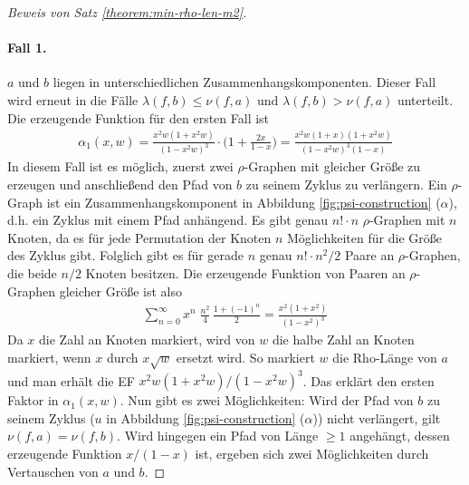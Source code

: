 \documentclass[a4paper, 10pt, ngerman]{article}
\begin{document}
\begin{proof}[Beweis von Satz \ref{theorem:min-rho-len-m2}]
        \paragraph{Fall 1.} $a$ und $b$ liegen in unterschiedlichen Zusammenhangskomponenten. Dieser Fall wird erneut in die Fälle $\lambda(f, b) \le \nu(f, a)$ und $\lambda(f, b) > \nu(f, a)$ unterteilt. Die erzeugende Funktion für den ersten Fall ist
        \begin{align*}
            \alpha_1(x, w) = \frac {x^2w(1 + x^2w)} {(1 - x^2w)^3} \cdot \Bigg (1 + \frac {2x} {1 - x} \Bigg ) = \frac {x^2w(1 + x)(1 + x^2w)} {(1 - x^2w)^3(1 - x)}
        \end{align*}
        In diesem Fall ist es möglich, zuerst zwei $\rho$-Graphen mit gleicher Größe zu erzeugen und anschließend den Pfad von $b$ zu seinem Zyklus zu verlängern. Ein $\rho$-Graph ist ein Zusammenhangskomponent in Abbildung \ref{fig:psi-construction} ($\alpha$), d.h. ein Zyklus mit einem Pfad anhängend. Es gibt genau $n! \cdot n$ $\rho$-Graphen mit $n$ Knoten, da es für jede Permutation der Knoten $n$ Möglichkeiten für die Größe des Zyklus gibt. Folglich gibt es für gerade $n$ genau $n! \cdot n^2/2$ Paare an $\rho$-Graphen, die beide $n/2$ Knoten besitzen. Die erzeugende Funktion von Paaren an $\rho$-Graphen gleicher Größe ist also
        \begin{align*}
            \sum_{n = 0}^\infty x^n \; \frac {n^2} 4 \, \frac {1 + (-1)^n} 2
            = \frac {x^2(1 + x^2)} {(1 - x^2)^3}
        \end{align*}
        Da $x$ die Zahl an Knoten markiert, wird von $w$ die halbe Zahl an Knoten markiert, wenn $x$ durch $x \sqrt w$ ersetzt wird. So markiert $w$ die Rho-Länge von $a$ und man erhält die EF $x^2w(1 + x^2w) / (1 - x^2w)^3$. Das erklärt den ersten Faktor in $\alpha_1(x, w)$. Nun gibt es zwei Möglichkeiten: Wird der Pfad von $b$ zu seinem Zyklus ($u$ in Abbildung \ref{fig:psi-construction} ($\alpha$)) nicht verlängert, gilt $\nu(f, a) = \nu(f, b)$. Wird hingegen ein Pfad von Länge $\ge 1$ angehängt, dessen erzeugende Funktion $x/(1 - x)$ ist, ergeben sich zwei Möglichkeiten durch Vertauschen von $a$ und $b$.


\end{proof}
\end{document}
